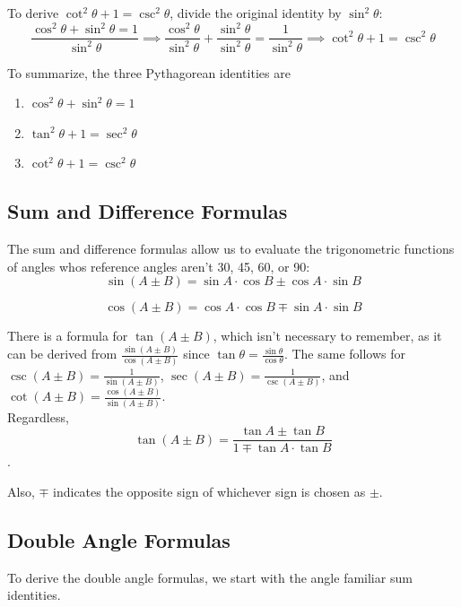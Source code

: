 \documentclass[12pt]{article}
\begin{document}
To derive \(\cot^2\theta+1=\csc^2\theta\), divide the original identity by \(\sin^2\theta\):\\

\[\frac{\cos^2\theta + \sin^2\theta = 1}{\sin^2\theta}\implies\frac{\cos^2\theta}{\sin^2\theta}+\frac{\sin^2\theta}{\sin^2\theta}=\frac{1}{\sin^2\theta}\implies\cot^2\theta+1=\csc^2\theta\]

To summarize, the three Pythagorean identities are 

\begin{enumerate}
	\item \(\cos^2\theta + \sin^2\theta = 1\)
	\item \(\tan^2\theta+1=\sec^2\theta\)
	\item  \(\cot^2\theta+1=\csc^2\theta\)
\end{enumerate}

\subsection{Sum and Difference Formulas}

The sum and difference formulas allow us to evaluate the trigonometric functions of angles whos reference angles aren't 30, 45, 60, or 90:\\

\[\sin(A\pm B)=\sin A\cdot\cos B \pm \cos A\cdot\sin B\]

\[\cos(A\pm B)=\cos A\cdot\cos B \mp \sin A\cdot\sin B\]

There is a formula for \(\tan(A\pm B)\), which isn't necessary to remember, as it can be derived from \(\frac{\sin(A\pm B)}{\cos(A\pm B)}\) since \(\tan\theta=\frac{\sin\theta}{\cos\theta}\). The same follows for \(\csc(A\pm B)=\frac{1}{\sin(A\pm B)}\), \(\sec(A\pm B)=\frac{1}{\csc(A\pm B)}\), and \(\cot(A\pm B)=\frac{\cos(A\pm B)}{\sin(A\pm B)}\).\\

Regardless, \\

\[\tan(A\pm B)=\frac{\tan A\pm \tan B}{1\mp\tan A\cdot\tan B}\].

Also, \(\mp\) indicates the opposite sign of whichever sign is chosen as \(\pm\).

\subsection{Double Angle Formulas}

To derive the double angle formulas, we start with the angle familiar sum identities.
\end{document}
